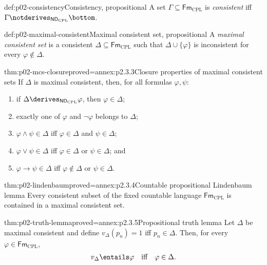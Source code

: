 \begin{hbdefinition}{def:p02-consistency}{Consistency, propositional}
A set \(\Gamma\subseteq\mathsf{Fm}_{\mathrm{CPL}}\) is
\emph{consistent} iff
\(\Gamma\notderives_{\mathsf{ND}_{\mathrm{CPL}}}\bottom\).
\end{hbdefinition}

\begin{hbdefinition}{def:p02-maximal-consistent}{Maximal consistent set, propositional}
A \emph{maximal consistent set} is a consistent
\(\Delta\subseteq\mathsf{Fm}_{\mathrm{CPL}}\) such that
\(\Delta\cup\{\varphi\}\) is inconsistent for every
\(\varphi\notin\Delta\).
\end{hbdefinition}

\begin{hblemma}{thm:p02-mcs-closure}{proved=annex:p2.3.3}{Closure properties of maximal consistent sets}
If \(\Delta\) is maximal consistent, then, for all formulas
\(\varphi,\psi\):
\begin{enumerate}
  \item if \(\Delta\derives_{\mathsf{ND}_{\mathrm{CPL}}}\varphi\), then
        \(\varphi\in\Delta\);
  \item exactly one of \(\varphi\) and \(\neg\varphi\) belongs to
        \(\Delta\);
  \item \(\varphi\land\psi\in\Delta\) iff
        \(\varphi\in\Delta\) and \(\psi\in\Delta\);
  \item \(\varphi\lor\psi\in\Delta\) iff
        \(\varphi\in\Delta\) or \(\psi\in\Delta\); and
  \item \(\varphi\to\psi\in\Delta\) iff
        \(\varphi\notin\Delta\) or \(\psi\in\Delta\).
\end{enumerate}
\end{hblemma}

\begin{hblemma}{thm:p02-lindenbaum}{proved=annex:p2.3.4}{Countable propositional Lindenbaum lemma}
Every consistent subset of the fixed countable language
\(\mathsf{Fm}_{\mathrm{CPL}}\) is contained in a maximal consistent set.
\end{hblemma}

\begin{hblemma}{thm:p02-truth-lemma}{proved=annex:p2.3.5}{Propositional truth lemma}
Let \(\Delta\) be maximal consistent and define
\(v_{\Delta}(p_n)=1\) iff \(p_n\in\Delta\).  Then, for every
\(\varphi\in\mathsf{Fm}_{\mathrm{CPL}}\),
\[
 v_{\Delta}\entails\varphi
 \quad\text{iff}\quad
 \varphi\in\Delta.
\]
\end{hblemma}

